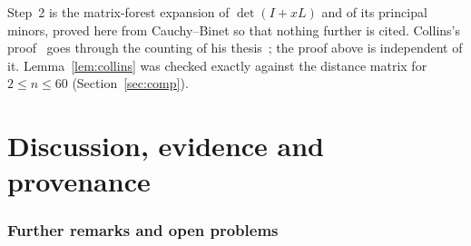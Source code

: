 \documentclass[11pt]{amsart}
\theoremstyle{definition}
\theoremstyle{remark}
\begin{document}
Step~2 is the matrix-forest expansion of $\det(I+xL)$ and of its principal
minors, proved here from Cauchy--Binet so that nothing further is cited.
Collins's proof~\cite{Col89} goes through the counting of his
thesis~\cite{Col86}; the proof above is independent of it. Lemma~\ref{lem:collins}
was checked exactly against the distance matrix for $2\le n\le60$
(Section~\ref{sec:comp}).
\part*{Discussion, evidence and provenance}

\section{Further remarks and open problems}\label{sec:open}
\end{document}
